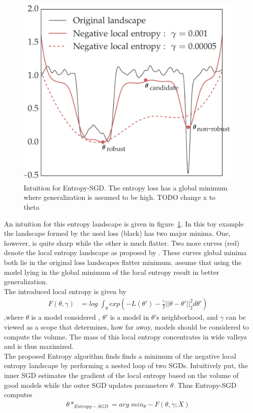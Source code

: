 \documentclass[a4paper]{scrartcl}
\begin{document}
\begin{figure}[H]
	\centering
	\includegraphics[width=.6\linewidth]{figures/entropy_1.pdf}
	\caption{Intuition for Entropy-SGD. The entropy loss has a global minimum where generalization is assumed to be high. TODO change x to theta}
	\label{fig:entropy}
\end{figure}
An intuition for this entropy landscape is given in figure~\ref{fig:entropy}. In this toy example the landscape formed by the used loss (black) has two major minima. One, however, is quite sharp while the other is much flatter. Two more curves (red) denote the local entropy landscape as proposed by \cite{chaudhari2019entropy}. These curves global minima both lie in the original loss landscapes flatter minimum. \cite{chaudhari2019entropy} assume that using the model lying in the global minimum of the local entropy result in better generalization.\\
The introduced local entropy is given by
\begin{align}
	F(\theta, \gamma) &= log\; \int_\theta exp(-L(\theta') - \frac{\gamma}{2}||\theta-\theta'||_2^2 d\theta') 
\end{align},where $\theta$ is a model considered , $\theta'$ is a model in $\theta$'s neighborhood, and $\gamma$ can be viewed as a scope that determines, how far away, models should be considered to compute the volume. The mass of this local entropy concentrates in wide valleys and is thus maximized.\\
The proposed Entropy algorithm finds finds a minimum of the negative local entropy landscape by performing a nested loop of two SGDs. Intuitively put, the inner SGD estimates the gradient of the local entropy based on the volume of good models while the outer SGD updates parameters $\theta$. Thus Entropy-SGD computes
\begin{align*}
	\theta*_{Entropy-SGD} = arg\;min_{\theta} - F(\theta, \gamma; X)
\end{align*}
\end{document}
